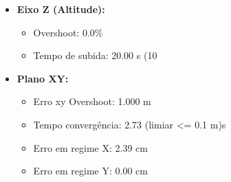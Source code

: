 \begin{itemize}
  \item \textbf{Eixo Z (Altitude):}
  \begin{itemize}
    \item Overshoot: 0.0\%
    \item Tempo de subida: 20.00 s (10%
  \end{itemize}
  \item \textbf{Plano XY:}
  \begin{itemize}
    \item Erro xy Overshoot: 1.000 m
    \item Tempo convergência: 2.73 (limiar <= 0.1 m)s
    \item Erro em regime X: 2.39 cm
    \item Erro em regime Y: 0.00 cm
  \end{itemize}
\end{itemize}
